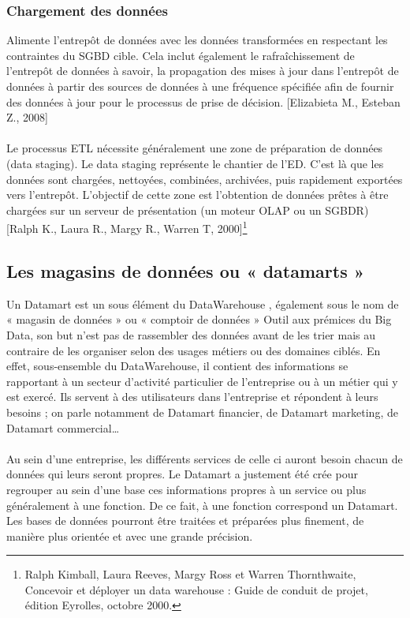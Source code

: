 \subsubsection{Chargement des données}
Alimente l’entrepôt de données avec les données transformées en respectant les contraintes du SGBD cible. Cela inclut également le rafraîchissement de l’entrepôt de données à savoir, la propagation des mises à jour dans l’entrepôt de données à partir des sources de données à une fréquence spécifiée afin de fournir des données à jour pour le processus de prise de décision. [Elizabieta M., Esteban Z., 2008]

\paragraph{}
Le processus ETL nécessite généralement une zone de préparation de données (data staging). Le data staging représente le chantier de l’ED. C’est là que les données sont chargées, nettoyées, combinées, archivées, puis rapidement exportées vers l’entrepôt. L’objectif de cette zone est l’obtention de données prêtes à être chargées sur un serveur de présentation (un moteur OLAP ou un SGBDR) [Ralph K., Laura R., Margy R., Warren T, 2000]\footnote{Ralph Kimball, Laura Reeves, Margy Ross et Warren Thornthwaite, Concevoir et déployer un data warehouse : Guide de conduit de projet, édition Eyrolles, octobre 2000.}



\subsection{Les magasins de données ou « datamarts »}
Un Datamart est un sous élément du DataWarehouse , également sous le nom de « magasin de données » ou « comptoir de données » Outil aux prémices du Big Data, son but n’est pas de rassembler des données avant de les trier mais au contraire de les organiser selon des usages métiers ou des domaines ciblés. En effet, sous-ensemble du DataWarehouse, il contient des informations se rapportant à un secteur d'activité particulier de l'entreprise ou à un métier qui y est exercé. Ils servent à des utilisateurs dans l’entreprise et répondent à leurs besoins ; on parle notamment de Datamart financier, de Datamart marketing, de Datamart commercial…
\paragraph{}
Au sein d’une entreprise, les différents services de celle ci auront besoin chacun de données qui leurs seront propres. Le Datamart a justement été crée pour regrouper au sein d’une base ces informations propres à un service ou plus généralement à une fonction. De ce fait, à une fonction correspond un Datamart. Les bases de données pourront être traitées et préparées plus finement, de manière plus orientée et avec une grande précision.
